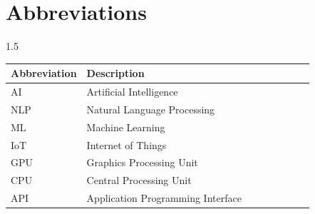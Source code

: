 \chapter*{Abbreviations} 

\begin{spacing}{1.5}
\begin{longtable}{>{\raggedright\arraybackslash}p{0.25\linewidth}>{\raggedright\arraybackslash}p{0.75\linewidth}}
    \textbf{Abbreviation} & \textbf{Description} \\
    \hline
    AI & Artificial Intelligence \\
    NLP & Natural Language Processing \\
    ML & Machine Learning \\
    IoT & Internet of Things \\
    GPU & Graphics Processing Unit \\
    CPU & Central Processing Unit \\
    API & Application Programming Interface \\
\end{longtable}
\end{spacing}




